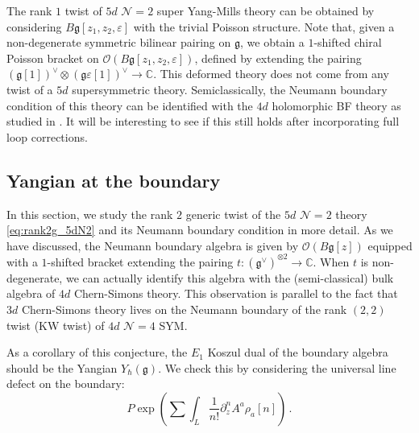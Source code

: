 \documentclass[11pt]{article}
\newcommand{\C}{\mathbb{C}}
\numberwithin{equation}{section}
\begin{document}
The rank $1$ twist of $5d$ $\mathcal{N} = 2$ super Yang-Mills theory can be obtained by considering $B\mathfrak{g}[z_1,z_2,\varepsilon]$ with the trivial Poisson structure. Note that, given a non-degenerate symmetric bilinear pairing on $\mathfrak{g}$, we obtain a $1$-shifted chiral Poisson bracket on $\mathcal{O}(B\mathfrak{g}[z_1,z_2,\varepsilon])$, defined by extending the pairing $(\mathfrak{g}[1])^{\vee}\otimes (\mathfrak{g}\varepsilon[1])^{\vee} \to \C$. This deformed theory does not come from any twist of a $5d$ supersymmetric theory. Semiclassically, the Neumann boundary condition of this theory can be identified with the $4d$ holomorphic BF theory as studied in \cite{Budzik:2023xbr}. It will be interesting to see if this still holds after incorporating full loop corrections.





\subsection{Yangian at the boundary}

In this section, we study the rank $2$ generic twist of the $5d$ $\mathcal{N} = 2$ theory \eqref{eq:rank2g_5dN2} and its Neumann boundary condition in more detail. As we have discussed, the Neumann boundary algebra is given by $\mathcal{O}(B\mathfrak{g}[z])$ equipped with a $1$-shifted bracket extending the pairing $t: (\mathfrak{g}^{\vee})^{\otimes 2} \to \C$. When $t$ is non-degenerate, we can actually identify this algebra with the (semi-classical) bulk algebra of $4d$ Chern-Simons theory. This observation is parallel to the fact that $3d$ Chern-Simons theory lives on the Neumann boundary of the rank $(2,2)$ twist (KW twist) of $4d$ $\mathcal{N}=4$ SYM. 

As a corollary of this conjecture, the $E_1$ Koszul dual of the boundary algebra should be the Yangian $Y_{\hbar}(\mathfrak{g})$. We check this by considering the universal line defect on the boundary:
\begin{equation}
	P \exp(\sum \int_{L} \frac{1}{n!}\partial_z^n A^a \rho_a[n])\,.
\end{equation}
\end{document}
